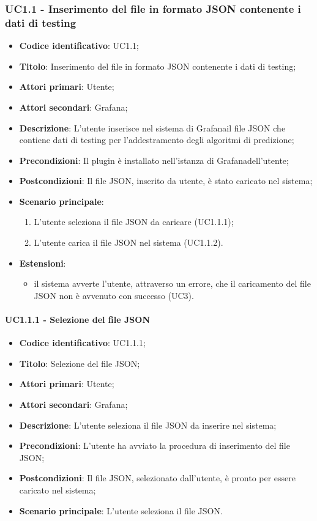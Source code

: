 \subsubsection{UC1.1 - Inserimento del file in formato JSON contenente i dati di testing}
\begin{itemize}
	\item \textbf{Codice identificativo}: UC1.1;
	\item \textbf{Titolo}: Inserimento del file in formato JSON contenente i dati di testing;
	\item \textbf{Attori primari}: Utente;
	\item \textbf{Attori secondari}: Grafana\glo;
	\item \textbf{Descrizione}: L'utente inserisce nel sistema di Grafana\glosp il file JSON che contiene dati di testing per l'addestramento degli algoritmi di predizione;
	\item \textbf{Precondizioni}: Il plugin è installato nell'istanza di Grafana\glosp dell'utente;
	\item \textbf{Postcondizioni}: Il file JSON, inserito da utente, è stato caricato nel sistema;
	\item \textbf{Scenario principale}:
		\begin{enumerate}
			\item L'utente seleziona il file JSON da caricare (UC1.1.1);
			\item L'utente carica il file JSON nel sistema (UC1.1.2).
		\end{enumerate}
	\item \textbf{Estensioni}:
		\begin{itemize}
			\item il sistema avverte l'utente, attraverso un errore, che il caricamento del file JSON non è avvenuto con successo (UC3).
		\end{itemize}
\end{itemize}

\paragraph{UC1.1.1 - Selezione del file JSON}
\begin{itemize}
	\item \textbf{Codice identificativo}: UC1.1.1;
	\item \textbf{Titolo}: Selezione del file JSON;
	\item \textbf{Attori primari}: Utente;
	\item \textbf{Attori secondari}: Grafana\glo;
	\item \textbf{Descrizione}: L'utente seleziona il file JSON da inserire nel sistema;
	\item \textbf{Precondizioni}: L'utente ha avviato la procedura di inserimento del file JSON;
	\item \textbf{Postcondizioni}: Il file JSON, selezionato dall'utente, è pronto per essere caricato nel sistema;
	\item \textbf{Scenario principale}: L'utente seleziona il file JSON.
\end{itemize}

